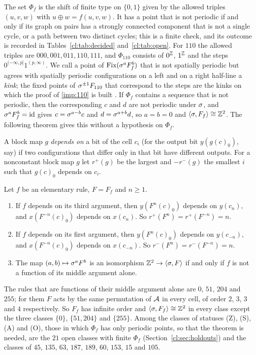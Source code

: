 The set $\Phi_f$ is the shift of finite type on $\{0,1\}$ given by the allowed triples $(u,v,w)$ with $u\oplus w=f(u,v,w)$. It has a point that is not periodic if and only if its graph on pairs has a strongly connected component that is not a single cycle, or a path between two distinct cycles; this is a finite check, and its outcome is recorded in Tables~\ref{cl:tab:decided} and~\ref{cl:tab:open}. For $110$ the allowed triples are $000,001,011,110,111$, and $\Phi_{110}$ consists of $0^{\mathbb{Z}}$, $1^{\mathbb{Z}}$ and the steps $0^{(-\infty,p]}1^{(p,\infty)}$. We call a point of $\mathrm{Fix}(\sigma^aF_f^b)$ that is not spatially periodic but agrees with spatially periodic configurations on a left and on a right half-line a \emph{kink}; the fixed points of $\sigma^{\pm1}F_{110}$ that correspond to the steps are the kinks on which the proof of \eqref{imp:110} is built \cite{PaperA}. If $\Phi_f$ contains a sequence that is not periodic, then the corresponding $c$ and $d$ are not periodic under $\sigma$, and $\sigma^aF_f^b=\mathrm{id}$ gives $c=\sigma^{a-b}c$ and $d=\sigma^{a+b}d$, so $a=b=0$ and $\langle\sigma,F_f\rangle\cong\mathbb{Z}^2$. The following theorem gives this without a hypothesis on $\Phi_f$.

A block map $g$ \emph{depends on} a bit of the cell $c_i$ (for the output bit $y(g(c)_0)$, say) if two configurations that differ only in that bit have different outputs. For a nonconstant block map $g$ let $r^+(g)$ be the largest and $-r^-(g)$ the smallest $i$ such that $g(c)_0$ depends on $c_i$.

\begin{theorem}\label{cl:thm:A}
Let $f$ be an elementary rule, $F=F_f$ and $n\ge1$.
\begin{enumerate}
\item If $f$ depends on its third argument, then $y(F^n(c)_0)$ depends on $y(c_n)$, and $x(F^{-n}(c)_0)$ depends on $x(c_n)$. So $r^+(F^n)=r^+(F^{-n})=n$.
\item If $f$ depends on its first argument, then $y(F^n(c)_0)$ depends on $y(c_{-n})$, and $x(F^{-n}(c)_0)$ depends on $x(c_{-n})$. So $r^-(F^n)=r^-(F^{-n})=n$.
\item The map $(a,b)\mapsto\sigma^aF^b$ is an isomorphism $\mathbb{Z}^2\to\langle\sigma,F\rangle$ if and only if $f$ is not a function of its middle argument alone.
\end{enumerate}
\end{theorem}

The rules that are functions of their middle argument alone are $0$, $51$, $204$ and $255$; for them $F$ acts by the same permutation of $\mathcal{A}$ in every cell, of order $2$, $3$, $3$ and $4$ respectively. So $F_f$ has infinite order and $\langle\sigma,F_f\rangle\cong\mathbb{Z}^2$ in every class except the three classes $\{0\}$, $\{51,204\}$ and $\{255\}$. Among the classes of statuses (Z), (S), (A) and (O), those in which $\Phi_f$ has only periodic points, so that the theorem is needed, are the $21$ open classes with finite $\Phi_f$ (Section~\ref{cl:sec:holdouts}) and the classes of $45$, $135$, $63$, $187$, $189$, $60$, $153$, $15$ and $105$.

